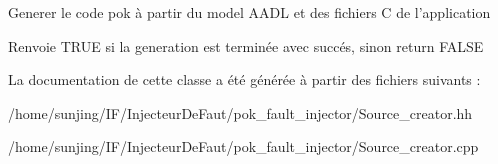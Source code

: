 Generer le code pok à partir du model AADL et des fichiers C de l'application

\begin{DoxyReturn}{Renvoie}
TRUE si la generation est terminée avec succés, sinon return FALSE 
\end{DoxyReturn}


La documentation de cette classe a été générée à partir des fichiers suivants :\begin{DoxyCompactItemize}
\item 
/home/sunjing/IF/InjecteurDeFaut/pok\_\-fault\_\-injector/Source\_\-creator.hh\item 
/home/sunjing/IF/InjecteurDeFaut/pok\_\-fault\_\-injector/Source\_\-creator.cpp\end{DoxyCompactItemize}

